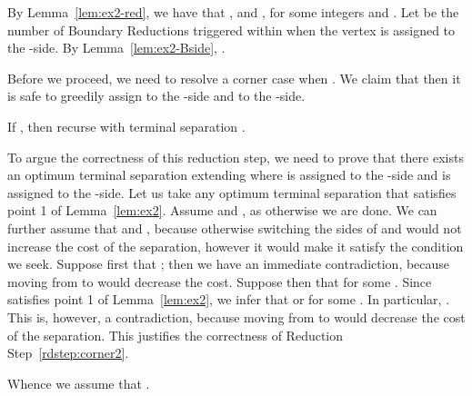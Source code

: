 By Lemma~\ref{lem:ex2-red}, we have that ,  and , for some integers  and . Let  be the number of Boundary Reductions triggered within  when the vertex  is assigned to the -side. By Lemma~\ref{lem:ex2-Bside}, .

Before we proceed, we need to resolve a corner case when . We claim that then it is safe to greedily assign  to the -side and  to the -side.

\begin{reductionstep}\label{rdstep:corner2}
If , then recurse with terminal separation .
\end{reductionstep}

To argue the correctness of this reduction step, we need to prove that there exists an optimum terminal separation extending  where  is assigned to the -side and  is assigned to the -side. Let us take any optimum terminal separation 
that satisfies point 1 of Lemma~\ref{lem:ex2}.
Assume  and , as otherwise we are done.
We can further assume that  and , because otherwise switching the sides of  and  would not increase the cost of the separation, however it would make it satisfy the condition we seek.
Suppose first that ; then we have an immediate contradiction, because moving  from  to  would decrease the cost.
Suppose then that  for some .
Since  satisfies point 1 of Lemma~\ref{lem:ex2},
we infer that  or  for some . In particular, . This is, however, a contradiction, because moving  from  to  would decrease the cost of the separation. This justifies the correctness of Reduction Step~\ref{rdstep:corner2}.

Whence we assume that .

